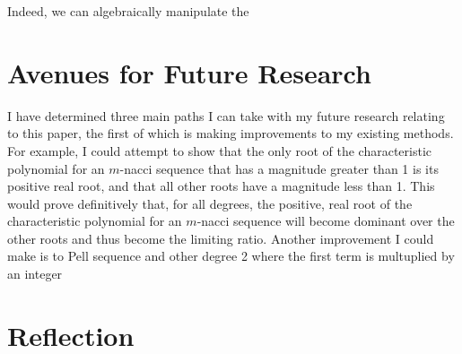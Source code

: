 \documentclass[11pt]{article}
\begin{document}
Indeed, we can algebraically manipulate the 


\section{Avenues for Future Research}
    I have determined three main paths I can take with my future research relating to this paper, the first of which is making improvements to my existing methods. For example, I could attempt to show that the only root of the characteristic polynomial for an \(m\)-nacci sequence that has a magnitude greater than 1 is its positive real root, and that all other roots have a magnitude less than 1. This would prove definitively that, for all degrees, the positive, real root of the characteristic polynomial for an \(m\)-nacci sequence will become dominant over the other roots and thus become the limiting ratio. Another improvement I could make is to 
Pell sequence and other degree 2 where the first term is multuplied by an integer 

\section{Reflection}


\newpage 
\end{document}
